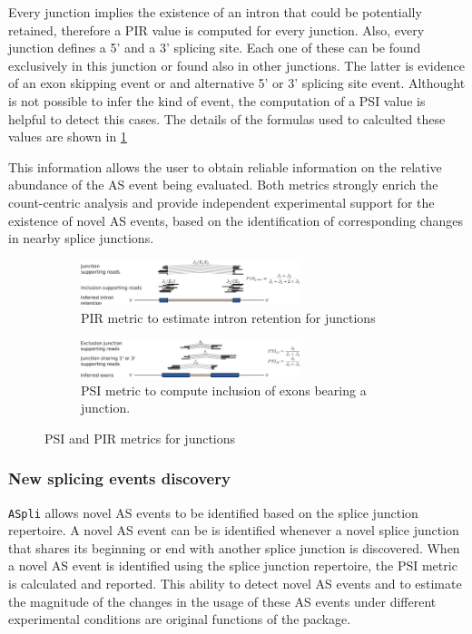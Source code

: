 \documentclass{article}
\begin{document}
Every junction implies the existence of an intron that could be potentially 
retained, therefore a PIR value is computed for every junction. Also, every
junction defines a 5' and a 3' splicing site. Each one of these can be found
exclusively in this junction or found also in other junctions. The latter is
evidence of an exon skipping event or and alternative 5' or 3' splicing site
event. Althought is not possible to infer the kind of event, the computation of
a PSI value is helpful to detect this cases. The details of the formulas used to
calculted these values are shown in \ref{fig:psir_junc}

This information allows the user to obtain reliable information on the relative
abundance of the AS event being evaluated. Both metrics strongly enrich the 
count-centric analysis and provide independent experimental support for the 
existence of novel AS events, based on the identification of corresponding 
changes in nearby splice junctions.

\begin{figure}
  \begin{subfigure}[t]{1\textwidth}
    \centering
    \includegraphics[width=0.7\textwidth]{images/pir_junc.pdf}
    \caption{ PIR metric to estimate intron retention for junctions}
  \end{subfigure}
  \begin{subfigure}[t]{1\textwidth}
    \centering
    \includegraphics[width=0.7\textwidth]{images/psi_junc.pdf}
    \caption{ PSI metric to compute inclusion of exons bearing a junction.} 
  \end{subfigure}
  \caption{PSI and PIR metrics for junctions}
  \label{fig:psir_junc}
\end{figure}


\subsubsection{New splicing events discovery} 
\texttt{ASpli} allows novel AS events to be identified based on the splice
junction repertoire. A novel AS event can be is identified whenever a
novel splice junction that shares its beginning or end with another splice 
junction is discovered. When a novel AS event is identified using the splice
junction repertoire, the PSI metric is calculated and reported. This ability to
detect novel AS events and to estimate the magnitude of the changes in the usage
of these AS events under different experimental conditions are original
functions of the package.
\end{document}
